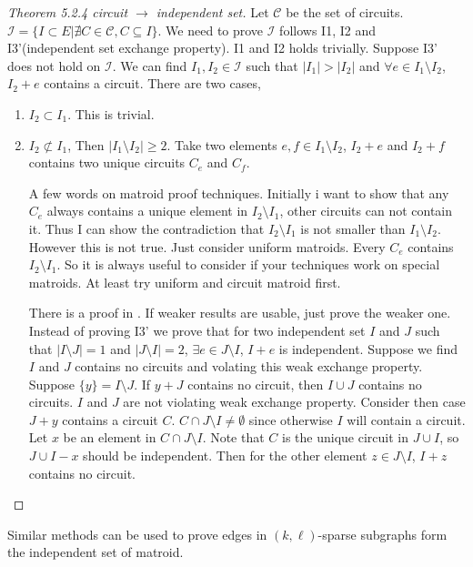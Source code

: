 \documentclass[12pt]{article}
\begin{document}
\begin{proof}[Theorem 5.2.4 circuit $\to$ independent set]
    Let $\mathcal C$ be the set of circuits. $\mathcal{I}=\{I\subset E| \nexists C\in \mathcal C, C\subseteq I\}$. We need to prove $\mathcal{I}$ follows I1, I2 and I3'(independent set exchange property). I1 and I2 holds trivially. Suppose I3' does not hold on $\mathcal I$. We can find $I_1,I_2\in \mathcal{I}$ such that $|I_1| > |I_2|$ and $\forall e\in I_1\setminus I_2$, $I_2+e$ contains a circuit. There are two cases,
    \begin{enumerate}
        \item $I_2\subset I_1$. This is trivial.
        \item $I_2 \not \subset I_1$, Then $|I_1\setminus I_2|\geq 2$. Take two elements $e,f\in I_1\setminus I_2$, $I_2+e$ and $I_2+f$ contains two unique circuits $C_e$ and $C_f$. 
        

        {\scriptsize{A few words on matroid proof techniques. Initially i want to show that any $C_e$ always contains a unique element in $I_2\setminus I_1$, other circuits can not contain it. Thus I can show the contradiction that $I_2\setminus I_1$ is not smaller than $I_1\setminus I_2$. However this is not true. Just consider uniform matroids. Every $C_e$ contains $I_2\setminus I_1$. So it is always useful to consider if your techniques work on special matroids. At least try uniform and circuit matroid first.}}
        
        There is a proof in \cite{schrijver_combinatorial_2003}. If weaker results are usable, just prove the weaker one. Instead of proving I3' we prove that for two independent set $I$ and $J$ such that $|I\setminus J|=1$ and $|J\setminus I| =2$, $\exists e\in J\setminus I$, $I+e$ is independent.
        Suppose we find $I$ and $J$ contains no circuits and volating this weak exchange property. Suppose $\{y\}=I\setminus J$. If $y+J$ contains no circuit, then $I\cup J$ contains no circuits. $I$ and $J$ are not violating weak exchange property. Consider then case $J+y$ contains a circuit $C$. $C\cap J\setminus I\not= \emptyset$ since otherwise $I$ will contain a circuit. Let $x$ be an element in $C\cap J\setminus I$. Note that $C$ is the unique circuit in $J\cup I$, so $J\cup I-x$ should be independent. Then for the other element $z\in J\setminus I$, $I+z$ contains no circuit.
    \end{enumerate}
\end{proof}
Similar methods can be used to prove edges in $(k,\ell)$-sparse subgraphs form the independent set of matroid.
\end{document}
